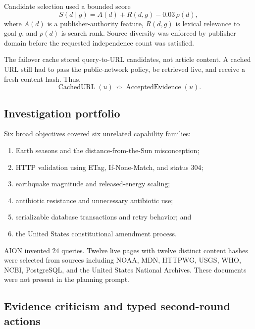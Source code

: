 Candidate selection used a bounded score
\begin{equation}
S(d\mid g)=A(d)+R(d,g)-0.03\,\rho(d),
\label{eq:arena-v2-source-score}
\end{equation}
where $A(d)$ is a publisher-authority feature, $R(d,g)$ is lexical relevance
to goal $g$, and $\rho(d)$ is search rank.  Source diversity was enforced by
publisher domain before the requested independence count was satisfied.

The failover cache stored query-to-URL candidates, not article content.  A
cached URL still had to pass the public-network policy, be retrieved live, and
receive a fresh content hash.  Thus,
\begin{equation}
\operatorname{CachedURL}(u)
\not\Rightarrow
\operatorname{AcceptedEvidence}(u).
\label{eq:arena-v2-cache-no-authority}
\end{equation}


\subsection{Investigation portfolio}
\label{subsec:arena-v2-portfolio}

Six broad objectives covered six unrelated capability families:
\begin{enumerate}
  \item Earth seasons and the distance-from-the-Sun misconception;
  \item HTTP validation using ETag, If-None-Match, and status 304;
  \item earthquake magnitude and released-energy scaling;
  \item antibiotic resistance and unnecessary antibiotic use;
  \item serializable database transactions and retry behavior; and
  \item the United States constitutional amendment process.
\end{enumerate}

AION invented 24 queries.  Twelve live pages with twelve distinct content
hashes were selected from sources including NOAA, MDN, HTTPWG, USGS, WHO,
NCBI, PostgreSQL, and the United States National Archives.  These documents
were not present in the planning prompt.


\subsection{Evidence criticism and typed second-round actions}
\label{subsec:arena-v2-actions}

